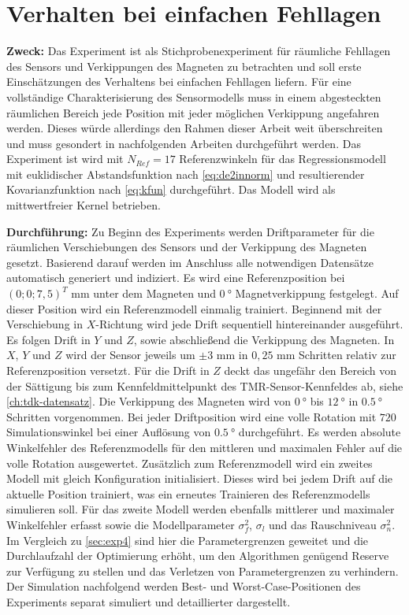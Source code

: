 %

\section{Verhalten bei einfachen Fehllagen}\label{sec:exp5}

\textbf{Zweck:} Das Experiment ist als Stichprobenexperiment für räumliche Fehllagen des Sensors und Verkippungen des Magneten zu betrachten und soll erste Einschätzungen des Verhaltens bei einfachen Fehllagen liefern. Für eine vollständige Charakterisierung des Sensormodells muss in einem abgesteckten räumlichen Bereich jede Position mit jeder möglichen Verkippung angefahren werden. Dieses würde allerdings den Rahmen dieser Arbeit weit überschreiten und muss gesondert in nachfolgenden Arbeiten durchgeführt werden. Das Experiment ist wird mit $N_{Ref} = 17$ Referenzwinkeln für das Regressionsmodell mit euklidischer Abstandsfunktion nach \autoref{eq:de2innorm} und resultierender Kovarianzfunktion nach \autoref{eq:kfun} durchgeführt. Das Modell wird als mittwertfreier Kernel betrieben.

\textbf{Durchführung:} Zu Beginn des Experiments werden Driftparameter für die räumlichen Verschiebungen des Sensors und der Verkippung des Magneten gesetzt. Basierend darauf werden im Anschluss alle notwendigen Datensätze automatisch generiert und indiziert. Es wird eine Referenzposition bei $(0;0;7,5)^T$ mm unter dem Magneten und $\SI{0}{\degree}$ Magnetverkippung festgelegt. Auf dieser Position wird ein Referenzmodell einmalig trainiert. Beginnend mit der Verschiebung in $X$-Richtung wird jede Drift sequentiell hintereinander ausgeführt. Es folgen Drift in $Y$ und $Z$, sowie abschließend die Verkippung des Magneten. In $X$, $Y$ und $Z$ wird der Sensor jeweils um $\pm 3$ mm in $0,25$ mm Schritten relativ zur Referenzposition versetzt. Für die Drift in $Z$ deckt das ungefähr den Bereich von der Sättigung bis zum Kennfeldmittelpunkt des TMR-Sensor-Kennfeldes ab, siehe \autoref{ch:tdk-datensatz}. Die Verkippung des Magneten wird von $\SI{0}{\degree}$ bis $\SI{12}{\degree}$ in $\SI{0,5}{\degree}$ Schritten vorgenommen. Bei jeder Driftposition wird eine volle Rotation mit $720$ Simulationswinkel bei einer Auflösung von $\SI{0,5}{\degree}$ durchgeführt. Es werden absolute Winkelfehler des Referenzmodells für den mittleren und maximalen Fehler auf die volle Rotation ausgewertet. Zusätzlich zum Referenzmodell wird ein zweites Modell mit gleich Konfiguration initialisiert. Dieses wird bei jedem Drift auf die aktuelle Position trainiert, was ein erneutes Trainieren des Referenzmodells simulieren soll. Für das zweite Modell werden ebenfalls mittlerer und maximaler Winkelfehler erfasst sowie die Modellparameter $\sigma_f^2$, $\sigma_l$ und das Rauschniveau $\sigma_n^2$. Im Vergleich zu \autoref{sec:exp4} sind hier die Parametergrenzen geweitet und die Durchlaufzahl der Optimierung erhöht, um den Algorithmen genügend Reserve zur Verfügung zu stellen und das Verletzen von Parametergrenzen zu verhindern. Der Simulation nachfolgend werden Best- und Worst-Case-Positionen des Experiments separat simuliert und detaillierter dargestellt.


